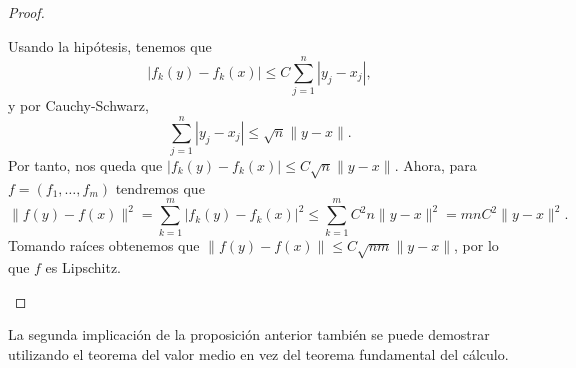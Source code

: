 \begin{proof}
\begin{description}
	Usando la hipótesis, tenemos que
	\[ \left|f_{k}\left(y\right)-f_{k}\left(x\right)\right|\leq C\sum^{n}_{j=1} \left|y_{j}-x_{j}\right| ,\]
	y por Cauchy-Schwarz,
	\[\sum^{n}_{j = 1} \left|y_{j}-x_{j}\right|\leq \sqrt{n} \|y-x\| .\]
	Por tanto, nos queda que $\displaystyle \left|f_{k}\left(y\right)-f_{k}\left(x\right)\right|\leq C\sqrt{n} \|y-x\| $. Ahora, para $\displaystyle f = \left(f_{1}, \ldots, f_{m}\right) $ tendremos que 
	\[\|f\left(y\right)-f\left(x\right)\|^{2}=\sum^{m}_{k = 1} \left|f_{k}\left(y\right)-f_{k}\left(x\right)\right|^{2}\leq \sum^{m}_{k = 1} C^{2}n \|y-x\|^{2}=mnC^{2}\|y-x\|^{2} .\]
	Tomando raíces obtenemos que $\displaystyle \|f\left(y\right)-f\left(x\right)\|\leq C\sqrt{nm}\|y-x\| $, por lo que $\displaystyle f $ es Lipschitz. 
	\end{description}
\end{proof}
\begin{observation}
La segunda implicación de la proposición anterior también se puede demostrar utilizando el teorema del valor medio en vez del teorema fundamental del cálculo.
\end{observation}

